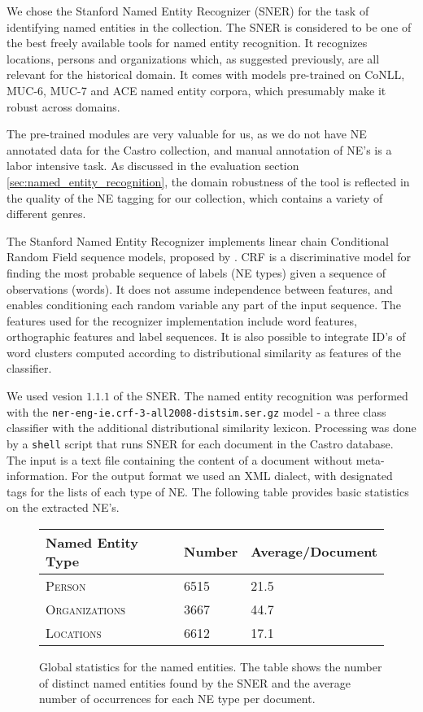 
We chose the Stanford Named Entity Recognizer (SNER) \cite{sner} for the task of identifying named entities in the collection.
The SNER is considered to be one of the best freely available tools for named entity recognition.
It recognizes locations, persons and organizations which, as suggested previously, are all relevant for the historical domain. 
It comes with models pre-trained on CoNLL, MUC-6, MUC-7 and ACE named entity corpora, which presumably make it robust across domains.

The pre-trained modules are very valuable for us, as we do not have NE annotated data for the Castro collection, and manual annotation of NE's is a labor intensive task. As discussed in the evaluation section \ref{sec:named_entity_recognition}, the domain robustness of the tool is reflected in the quality of the NE tagging for our collection, which contains a variety of different genres. 

The Stanford Named Entity Recognizer implements linear chain Conditional Random Field sequence models, proposed by \cite{lafferty2001conditional}.
CRF is a discriminative model for finding the most probable sequence of labels (NE types) given a sequence of observations (words). 
It does not assume independence between features, and enables conditioning each random variable any part of the input sequence. The features used for the recognizer implementation include word features, orthographic features and label sequences. It is also possible to integrate ID's of word clusters computed according to distributional similarity as features of the classifier.

We used vesion $1.1.1$ of the SNER. The named entity recognition was performed with the
\texttt{ner-eng-ie.crf-3-all2008-distsim.ser.gz} model - a three class classifier with the additional
distributional similarity lexicon. Processing was done by a
\texttt{shell} script that runs SNER for each document in the Castro database. The input is a
text file containing the content of a document without meta-information. For the output format we
used an XML dialect, with designated tags for the lists of each type of NE. The following table provides basic statistics on the extracted NE's.

\begin{figure}[ht]
\centering
\caption{Global statistics for the named entities. The table shows the number of distinct named
entities found by the SNER and the average number of occurrences for each NE type per document.}
\begin{tabular}{l|ll}
  Named Entity Type      & Number & Average/Document\\
  \hline
  \textsc{Person}        & 6515   & 21.5\\
  \textsc{Organizations} & 3667   & 44.7\\
  \textsc{Locations}     & 6612   & 17.1\\
\end{tabular}
\label{fig:ne_statistics}
\end{figure}


